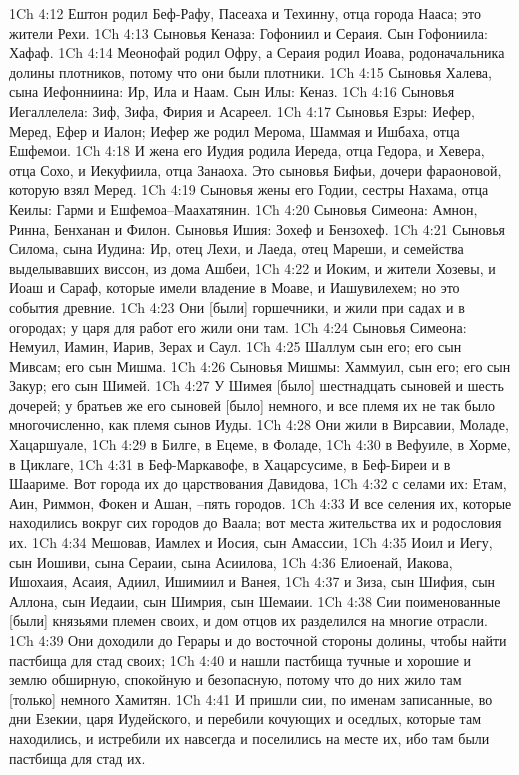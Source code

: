 1Ch 4:12  Ештон родил Беф-Рафу, Пасеаха и Техинну, отца города Нааса; это жители Рехи.
1Ch 4:13  Сыновья Кеназа: Гофониил и Сераия. Сын Гофониила: Хафаф.
1Ch 4:14  Меонофай родил Офру, а Сераия родил Иоава, родоначальника долины плотников, потому что они были плотники.
1Ch 4:15  Сыновья Халева, сына Иефонниина: Ир, Ила и Наам. Сын Илы: Кеназ.
1Ch 4:16  Сыновья Иегаллелела: Зиф, Зифа, Фирия и Асареел.
1Ch 4:17  Сыновья Езры: Иефер, Меред, Ефер и Иалон; Иефер же родил Мерома, Шаммая и Ишбаха, отца Ешфемои.
1Ch 4:18  И жена его Иудия родила Иереда, отца Гедора, и Хевера, отца Сохо, и Иекуфиила, отца Занаоха. Это сыновья Бифьи, дочери фараоновой, которую взял Меред.
1Ch 4:19  Сыновья жены его Годии, сестры Нахама, отца Кеилы: Гарми и Ешфемоа--Маахатянин.
1Ch 4:20  Сыновья Симеона: Амнон, Ринна, Бенханан и Филон. Сыновья Ишия: Зохеф и Бензохеф.
1Ch 4:21  Сыновья Силома, сына Иудина: Ир, отец Лехи, и Лаеда, отец Мареши, и семейства выделывавших виссон, из дома Ашбеи,
1Ch 4:22  и Иоким, и жители Хозевы, и Иоаш и Сараф, которые имели владение в Моаве, и Иашувилехем; но это события древние.
1Ch 4:23  Они [были] горшечники, и жили при садах и в огородах; у царя для работ его жили они там.
1Ch 4:24  Сыновья Симеона: Немуил, Иамин, Иарив, Зерах и Саул.
1Ch 4:25  Шаллум сын его; его сын Мивсам; его сын Мишма.
1Ch 4:26  Сыновья Мишмы: Хаммуил, сын его; его сын Закур; его сын Шимей.
1Ch 4:27  У Шимея [было] шестнадцать сыновей и шесть дочерей; у братьев же его сыновей [было] немного, и все племя их не так было многочисленно, как племя сынов Иуды.
1Ch 4:28  Они жили в Вирсавии, Моладе, Хацаршуале,
1Ch 4:29  в Билге, в Ецеме, в Фоладе,
1Ch 4:30  в Вефуиле, в Хорме, в Циклаге,
1Ch 4:31  в Беф-Маркавофе, в Хацарсусиме, в Беф-Биреи и в Шаариме. Вот города их до царствования Давидова,
1Ch 4:32  с селами их: Етам, Аин, Риммон, Фокен и Ашан, --пять городов.
1Ch 4:33  И все селения их, которые находились вокруг сих городов до Ваала; вот места жительства их и родословия их.
1Ch 4:34  Мешовав, Иамлех и Иосия, сын Амассии,
1Ch 4:35  Иоил и Иегу, сын Иошиви, сына Сераии, сына Асиилова,
1Ch 4:36  Елиоенай, Иакова, Ишохаия, Асаия, Адиил, Ишимиил и Ванея,
1Ch 4:37  и Зиза, сын Шифия, сын Аллона, сын Иедаии, сын Шимрия, сын Шемаии.
1Ch 4:38  Сии поименованные [были] князьями племен своих, и дом отцов их разделился на многие отрасли.
1Ch 4:39  Они доходили до Герары и до восточной стороны долины, чтобы найти пастбища для стад своих;
1Ch 4:40  и нашли пастбища тучные и хорошие и землю обширную, спокойную и безопасную, потому что до них жило там [только] немного Хамитян.
1Ch 4:41  И пришли сии, по именам записанные, во дни Езекии, царя Иудейского, и перебили кочующих и оседлых, которые там находились, и истребили их навсегда и поселились на месте их, ибо там были пастбища для стад их.
